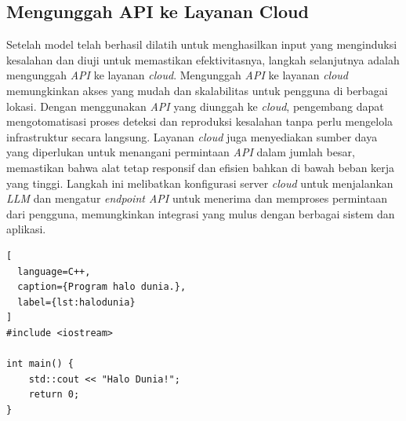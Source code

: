 \subsection{Mengunggah API ke Layanan Cloud}
\label{sec:mengunggah api}

Setelah model telah berhasil dilatih untuk menghasilkan 
input yang menginduksi kesalahan dan diuji untuk memastikan 
efektivitasnya, langkah selanjutnya adalah mengunggah 
\emph{API} ke layanan \emph{cloud}. Mengunggah \emph{API} 
ke layanan \emph{cloud} memungkinkan akses yang mudah dan 
skalabilitas untuk pengguna di berbagai lokasi. Dengan 
menggunakan \emph{API} yang diunggah ke \emph{cloud}, 
pengembang dapat mengotomatisasi proses deteksi dan 
reproduksi kesalahan tanpa perlu mengelola infrastruktur 
secara langsung. Layanan \emph{cloud} juga menyediakan 
sumber daya yang diperlukan untuk menangani permintaan 
\emph{API} dalam jumlah besar, memastikan bahwa alat 
tetap responsif dan efisien bahkan di bawah beban kerja 
yang tinggi. Langkah ini melibatkan konfigurasi server 
\emph{cloud} untuk menjalankan \emph{LLM} dan mengatur 
\emph{endpoint API} untuk menerima dan memproses permintaan 
dari pengguna, memungkinkan integrasi yang mulus dengan 
berbagai sistem dan aplikasi.

\begin{lstlisting}[
  language=C++,
  caption={Program halo dunia.},
  label={lst:halodunia}
]
#include <iostream>

int main() {
    std::cout << "Halo Dunia!";
    return 0;
}
\end{lstlisting}

\lipsum[2-3]





